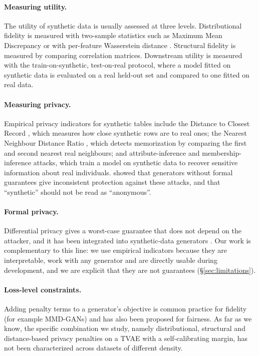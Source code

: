\documentclass[11pt,a4paper]{article}
\begin{document}
\paragraph{Measuring utility.}
The utility of synthetic data is usually assessed at three levels.
Distributional fidelity is measured with two-sample statistics such as Maximum
Mean Discrepancy \citep{gretton2012mmd} or with per-feature Wasserstein
distance \citep{rubner2000emd}. Structural fidelity is measured by comparing
correlation matrices. Downstream utility is measured with the
train-on-synthetic, test-on-real protocol, where a model fitted on synthetic
data is evaluated on a real held-out set and compared to one fitted on real
data.

\paragraph{Measuring privacy.}
Empirical privacy indicators for synthetic tables include the Distance to
Closest Record \citep{park2018tablegan}, which measures how close synthetic
rows are to real ones; the Nearest Neighbour Distance Ratio
\citep{zhao2021ctabgan}, which detects memorization by comparing the first
and second nearest real neighbours; and attribute-inference and
membership-inference attacks, which train a model on synthetic data to recover
sensitive information about real individuals. \citet{stadler2022groundhog}
showed that generators without formal guarantees give inconsistent protection
against these attacks, and that ``synthetic'' should not be read as
``anonymous''.

\paragraph{Formal privacy.}
Differential privacy \citep{dwork2006dp} gives a worst-case guarantee that
does not depend on the attacker, and it has been integrated into synthetic-data
generators \citep{xie2018dpgan,jordon2019pategan}. Our work is complementary to
this line: we use empirical indicators because they are interpretable, work
with any generator and are directly usable during development, and we are
explicit that they are not guarantees (\S\ref{sec:limitations}).

\paragraph{Loss-level constraints.}
Adding penalty terms to a generator's objective is common practice for
fidelity (for example MMD-GANs) and has also been proposed for fairness. As
far as we know, the specific combination we study, namely distributional,
structural and distance-based privacy penalties on a TVAE with a
self-calibrating margin, has not been characterized across datasets of
different density.
\end{document}
